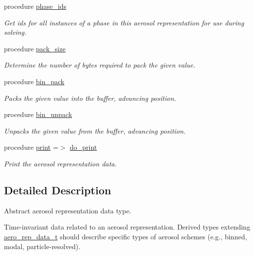 \begin{DoxyCompactItemize}
procedure \mbox{\hyperlink{structpmc__aero__rep__data_1_1aero__rep__data__t_ae8ea3228c47870eb42a519106bcd5fa1}{phase\+\_\+ids}}
\begin{DoxyCompactList}\small\item\em Get ids for all instances of a phase in this aerosol representation for use during solving. \end{DoxyCompactList}\item 
procedure \mbox{\hyperlink{structpmc__aero__rep__data_1_1aero__rep__data__t_a591098eb090789401ae5bcd8e5fa288f}{pack\+\_\+size}}
\begin{DoxyCompactList}\small\item\em Determine the number of bytes required to pack the given value. \end{DoxyCompactList}\item 
procedure \mbox{\hyperlink{structpmc__aero__rep__data_1_1aero__rep__data__t_a5f8404ed1dc6559be115f734379d9609}{bin\+\_\+pack}}
\begin{DoxyCompactList}\small\item\em Packs the given value into the buffer, advancing position. \end{DoxyCompactList}\item 
procedure \mbox{\hyperlink{structpmc__aero__rep__data_1_1aero__rep__data__t_a93e85c4972bf08fcdf82eaac8821d50c}{bin\+\_\+unpack}}
\begin{DoxyCompactList}\small\item\em Unpacks the given value from the buffer, advancing position. \end{DoxyCompactList}\item 
procedure \mbox{\hyperlink{structpmc__aero__rep__data_1_1aero__rep__data__t_aa7b87ff824682f28d4696865546e4e77}{print}} =$>$ \mbox{\hyperlink{namespacepmc__aero__rep__data_a31a32f41ba259b6eef1636b933353001}{do\+\_\+print}}
\begin{DoxyCompactList}\small\item\em Print the aerosol representation data. \end{DoxyCompactList}\end{DoxyCompactItemize}


\subsection{Detailed Description}
Abstract aerosol representation data type. 

Time-\/invariant data related to an aerosol representation. Derived types extending \mbox{\hyperlink{structpmc__aero__rep__data_1_1aero__rep__data__t}{aero\+\_\+rep\+\_\+data\+\_\+t}} should describe specific types of aerosol schemes (e.\+g., binned, modal, particle-\/resolved).

